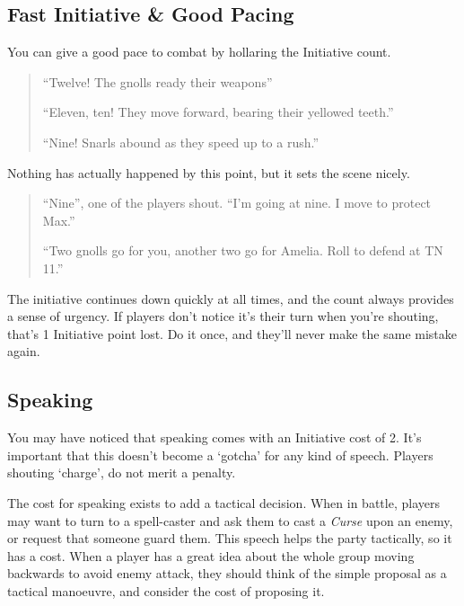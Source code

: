 \begin{multicols}{2}

\subsection{Fast Initiative \& Good Pacing}

You can give a good pace to combat by hollaring the Initiative count.

\begin{quote}

``Twelve! The gnolls ready their weapons''

``Eleven, ten! They move forward, bearing their yellowed teeth.''

``Nine! Snarls abound as they speed up to a rush.''

\end{quote}

Nothing has actually happened by this point, but it sets the scene nicely.

\begin{quote}

``Nine'', one of the players shout.  ``I'm going at nine.  I move to protect Max.''

``Two gnolls go for you, another two go for Amelia.  Roll to defend at TN 11.''

\end{quote}

The initiative continues down quickly at all times, and the count always provides a sense of urgency.
If players don't notice it's their turn when you're shouting, that's 1 Initiative point lost.
Do it once, and they'll never make the same mistake again.

\subsection{Speaking}

You may have noticed that speaking comes with an Initiative cost of 2.
It's important that this doesn't become a `gotcha' for any kind of speech.
Players shouting `charge', do not merit a penalty.

The cost for speaking exists to add a tactical decision.
When in battle, players may want to turn to a spell-caster and ask them to cast a \textit{Curse} upon an enemy, or request that someone guard them.
This speech helps the party tactically, so it has a cost.
When a player has a great idea about the whole group moving backwards to avoid enemy attack, they should think of the simple proposal as a tactical manoeuvre, and consider the cost of proposing it.


\end{multicols}

